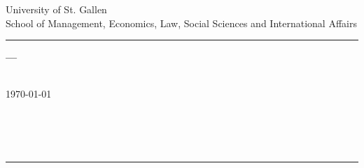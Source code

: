 \begin{center}
\Large{
University of St. Gallen\\
School of Management, Economics, Law, Social Sciences and International Affairs
}
\vspace{.9cm}
\hrule
\vspace{2.8cm}
\Huge{\textsf{\textbf{
\theTitle
}}}
\vspace{.5cm}

\Large{\textsf{\textbf{---\\ \theSubtitle}}}\\
\vspace{2.8cm}

\Large{\today}\\
\vspace{.9cm}

\Large{
\theAuthor\\
\theAddress\\
\theZip~\theCity\\
\theMatriculation}
\vspace{2.8cm}
\hrule
\vspace{.9cm}
\Large{\theType\\
\theSupervisor\\
\theSemester}
\end{center}
\thispagestyle{empty}